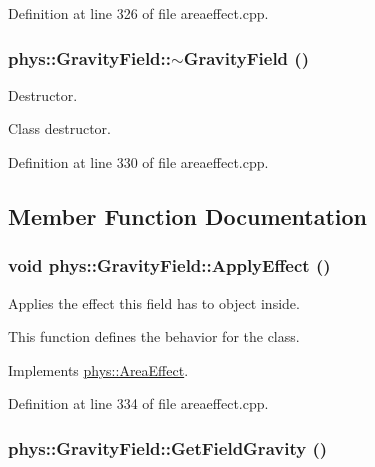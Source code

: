 Definition at line 326 of file areaeffect.cpp.

\hypertarget{classphys_1_1GravityField_ae41a656b247a2982da2e1ae666c605d0}{
\subsubsection[{$\sim$GravityField}]{\setlength{\rightskip}{0pt plus 5cm}phys::GravityField::$\sim$GravityField ()}}
\label{d4/d8a/classphys_1_1GravityField_ae41a656b247a2982da2e1ae666c605d0}


Destructor. 

Class destructor. 

Definition at line 330 of file areaeffect.cpp.



\subsection{Member Function Documentation}
\hypertarget{classphys_1_1GravityField_a0322cb1635bbcb951493d9e17cc9acb1}{
\subsubsection[{ApplyEffect}]{\setlength{\rightskip}{0pt plus 5cm}void phys::GravityField::ApplyEffect ()}}
\label{d4/d8a/classphys_1_1GravityField_a0322cb1635bbcb951493d9e17cc9acb1}


Applies the effect this field has to object inside. 

This function defines the behavior for the class. 

Implements \hyperlink{classphys_1_1AreaEffect_a3b285ecfcf9c9200662d510e48dd222a}{phys::AreaEffect}.



Definition at line 334 of file areaeffect.cpp.

\hypertarget{classphys_1_1GravityField_ae776978b7e8fa1d656bdb216aa6f2d20}{
\subsubsection[{GetFieldGravity}]{ phys::GravityField::GetFieldGravity ()}}
\label{d4/d8a/classphys_1_1GravityField_ae776978b7e8fa1d656bdb216aa6f2d20}


